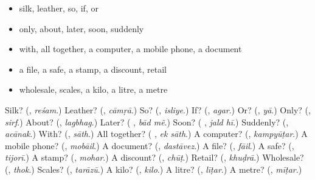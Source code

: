 \begin{itemize}
\raggedright
  \item silk, leather, so, if, or
  \item only, about, later, soon, suddenly
  \item with, all together, a computer, a mobile phone, a document
  \item a file, a safe, a stamp, a discount, retail
  \item wholesale, scales, a kilo, a litre, a metre
\end{itemize}

\begin{tcolorbox}[breakable,colback=teal!4,colframe=teal!35!black,title={Before you move on}]
Silk? (\textbf{}, \emph{reśam}.) Leather? (\textbf{}, \emph{cāmṛā}.) So? (\textbf{}, \emph{isliye}.) If? (\textbf{}, \emph{agar}.) Or? (\textbf{}, \emph{yā}.) Only? (\textbf{}, \emph{sirf}.) About? (\textbf{}, \emph{lagbhag}.) Later? (\textbf{ }, \emph{bād mẽ}.) Soon? (\textbf{ }, \emph{jald hī}.) Suddenly? (\textbf{}, \emph{acānak}.) With? (\textbf{}, \emph{sāth}.) All together? (\textbf{ }, \emph{ek sāth}.) A computer? (\textbf{}, \emph{kampyūṭar}.) A mobile phone? (\textbf{}, \emph{mobāil}.) A document? (\textbf{}, \emph{dastāvez}.) A file? (\textbf{}, \emph{fāil}.) A safe? (\textbf{}, \emph{tijorī}.) A stamp? (\textbf{}, \emph{mohar}.) A discount? (\textbf{}, \emph{chūṭ}.) Retail? (\textbf{}, \emph{khuḍrā}.) Wholesale? (\textbf{}, \emph{thok}.) Scales? (\textbf{}, \emph{tarāzū}.) A kilo? (\textbf{}, \emph{kilo}.) A litre? (\textbf{}, \emph{līṭar}.) A metre? (\textbf{}, \emph{mīṭar}.)
\end{tcolorbox}
